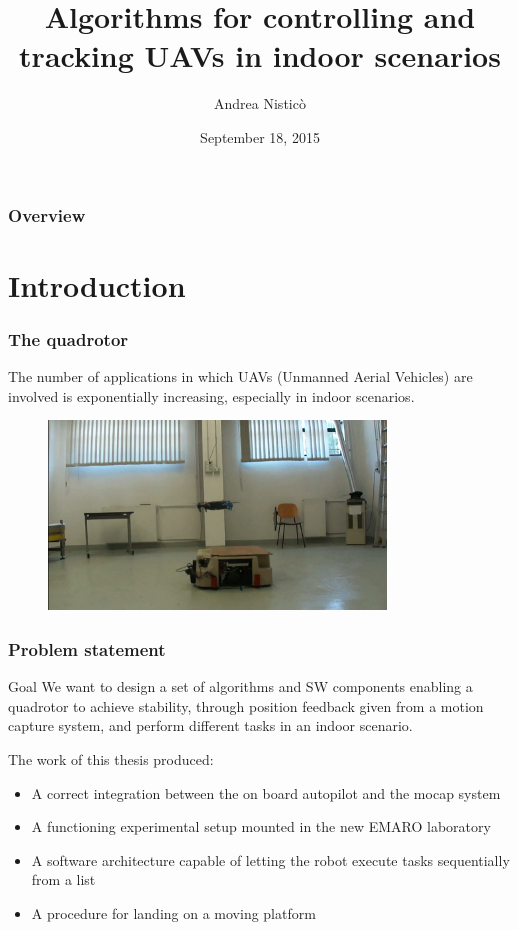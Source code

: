\documentclass[xcolor=dvipsnames]{beamer}
\title[Algorithms for controlling and tracking UAVs in indoor scenarios]{Algorithms for controlling and tracking UAVs in indoor scenarios}
\author{Andrea Nisticò} %
\institute[UNIGE] %
{
Supervised by: Marco Baglietto, Fulvio Mastrogiovanni \\
Co-supervised by: Tommaso Falchi Delitalia \\
\medskip
DIBRIS - Department of Informatics, Bioengineering, Robotics, and Systems Engineering \\
\smallskip
University of Genova
\medskip

Degree in \textit{Robotics Engineering} 
}
\date{September 18, 2015} %
\begin{document}
\begin{frame}
\titlepage %
\end{frame}

\begin{frame}
\frametitle{Overview} 
\tableofcontents[sectionstyle=show,square]
\end{frame}


\section{Introduction} 

\begin{frame}
\frametitle{The quadrotor}
The number of applications in which UAVs (Unmanned Aerial Vehicles) are involved is exponentially increasing, especially in indoor scenarios.
\begin{figure}
\centering
\includegraphics[width = 0.8\textwidth]{f/intro.png}
\end{figure}
\end{frame}


\begin{frame}
\frametitle{Problem statement}
\begin{block}{Goal}
We want to design a set of algorithms and SW components enabling a quadrotor
to achieve stability, through position feedback given from a motion capture system,
and perform different tasks in an indoor scenario.
\end{block} 
The work of this thesis produced:
\begin{itemize}
\item A correct integration between the on board autopilot and the mocap system
\item A functioning experimental setup mounted in the new EMARO laboratory
\item A software architecture capable of letting the robot execute tasks sequentially from a list
\item A procedure for landing on a moving platform
\end{itemize}
\end{frame}
\end{document}
